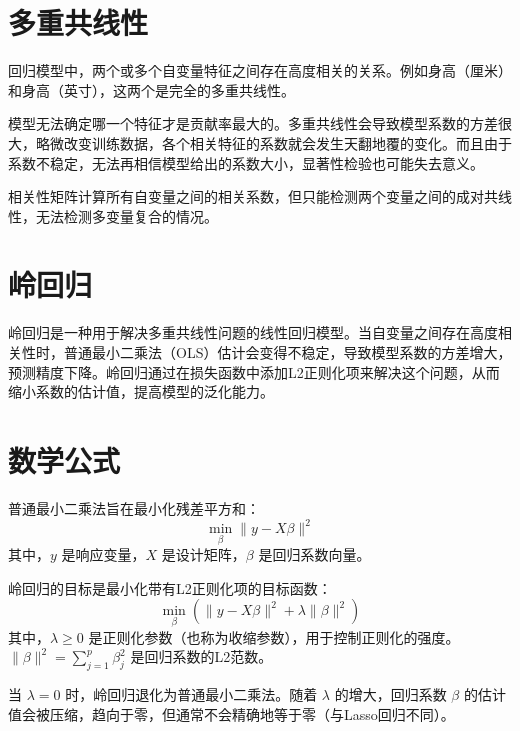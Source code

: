 \section{多重共线性}

\begin{definition}[多重共线性]
    回归模型中，两个或多个自变量特征之间存在高度相关的关系。例如身高（厘米）和身高（英寸），这两个是完全的多重共线性。

    模型无法确定哪一个特征才是贡献率最大的。多重共线性会导致模型系数的方差很大，略微改变训练数据，各个相关特征的系数就会发生天翻地覆的变化。而且由于系数不稳定，无法再相信模型给出的系数大小，显著性检验也可能失去意义。
\end{definition}

\begin{theorem}[检测多重共线性]
    相关性矩阵计算所有自变量之间的相关系数，但只能检测两个变量之间的成对共线性，无法检测多变量复合的情况。
\end{theorem}

\begin{definition}[方差膨胀因子]

\end{definition}

\section{岭回归}

\begin{definition}[岭回归]
    岭回归是一种用于解决多重共线性问题的线性回归模型。当自变量之间存在高度相关性时，普通最小二乘法（OLS）估计会变得不稳定，导致模型系数的方差增大，预测精度下降。岭回归通过在损失函数中添加L2正则化项来解决这个问题，从而缩小系数的估计值，提高模型的泛化能力。
\end{definition}

\section{数学公式}
普通最小二乘法旨在最小化残差平方和：
$$ \min_{\beta} \|y - X\beta\|^2 $$
其中，$y$ 是响应变量，$X$ 是设计矩阵，$\beta$ 是回归系数向量。

岭回归的目标是最小化带有L2正则化项的目标函数：
$$ \min_{\beta} \left( \|y - X\beta\|^2 + \lambda \|\beta\|^2 \right) $$
其中，$\lambda \ge 0$ 是正则化参数（也称为收缩参数），用于控制正则化的强度。$\|\beta\|^2 = \sum_{j=1}^{p} \beta_j^2$ 是回归系数的L2范数。

当 $\lambda = 0$ 时，岭回归退化为普通最小二乘法。随着 $\lambda$ 的增大，回归系数 $\beta$ 的估计值会被压缩，趋向于零，但通常不会精确地等于零（与Lasso回归不同）。

